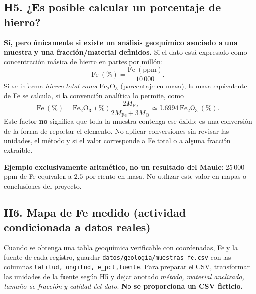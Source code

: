 \documentclass[11pt,a4paper]{article}
\begin{document}
\subsection{H5. ¿Es posible calcular un porcentaje de hierro?}
\textbf{Sí, pero únicamente si existe un análisis geoquímico asociado
a una muestra y una fracción/material definidos.} Si el dato está
expresado como concentración másica de hierro en partes por millón:
\[
\mathrm{Fe\ (\%)}=\frac{\mathrm{Fe\ (ppm)}}{10\,000}.
\]
Si se informa \emph{hierro total como} $\mathrm{Fe_2O_3}$ (porcentaje
en masa), la masa equivalente de Fe se calcula, si la convención analítica
lo permite, como
\[
\mathrm{Fe\ (\%)}=\mathrm{Fe_2O_3\ (\%)}
\frac{2M_{\mathrm{Fe}}}{2M_{\mathrm{Fe}}+3M_{\mathrm{O}}}
\simeq 0.6994\,\mathrm{Fe_2O_3\ (\%)}.
\]
Este factor \textbf{no} significa que toda la muestra contenga ese
óxido: es una conversión de la forma de reportar el elemento.
No aplicar conversiones sin revisar las unidades, el método y si el
valor corresponde a Fe total o a alguna fracción extraíble.

\textbf{Ejemplo exclusivamente aritmético, no un resultado del Maule:}
$25\,000$ ppm de Fe equivalen a $2.5$ por ciento en masa. No utilizar
este valor en mapas o conclusiones del proyecto.

\subsection{H6. Mapa de Fe medido (actividad condicionada a datos reales)}
Cuando se obtenga una tabla geoquímica verificable con coordenadas,
Fe y la fuente de cada registro, guardar
\texttt{datos/geologia/muestras\_fe.csv} con las columnas
\texttt{latitud,longitud,fe\_pct,fuente}. Para preparar el CSV,
transformar las unidades de la fuente según H5 y dejar anotado
\emph{método, material analizado, tamaño de fracción y calidad del dato}.
\textbf{No se proporciona un CSV ficticio.}
\end{document}
